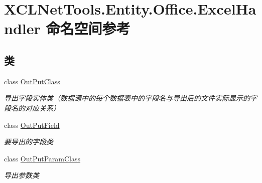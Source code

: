 \hypertarget{namespace_x_c_l_net_tools_1_1_entity_1_1_office_1_1_excel_handler}{}\section{X\+C\+L\+Net\+Tools.\+Entity.\+Office.\+Excel\+Handler 命名空间参考}
\label{namespace_x_c_l_net_tools_1_1_entity_1_1_office_1_1_excel_handler}
\subsection*{类}
\begin{DoxyCompactItemize}
\item 
class \hyperlink{class_x_c_l_net_tools_1_1_entity_1_1_office_1_1_excel_handler_1_1_out_put_class}{Out\+Put\+Class}
\begin{DoxyCompactList}\small\item\em 导出字段实体类（数据源中的每个数据表中的字段名与导出后的文件实际显示的字段名的对应关系） \end{DoxyCompactList}\item 
class \hyperlink{class_x_c_l_net_tools_1_1_entity_1_1_office_1_1_excel_handler_1_1_out_put_field}{Out\+Put\+Field}
\begin{DoxyCompactList}\small\item\em 要导出的字段类 \end{DoxyCompactList}\item 
class \hyperlink{class_x_c_l_net_tools_1_1_entity_1_1_office_1_1_excel_handler_1_1_out_put_param_class}{Out\+Put\+Param\+Class}
\begin{DoxyCompactList}\small\item\em 导出参数类 \end{DoxyCompactList}\end{DoxyCompactItemize}

